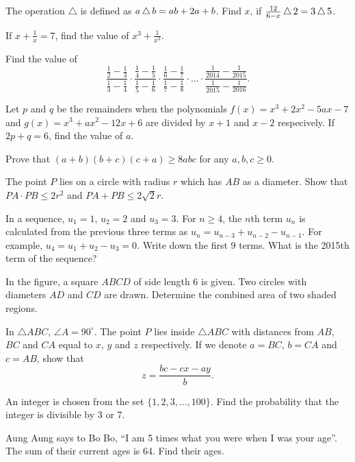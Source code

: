 \begin{problems}
    \problem The operation $\triangle$ is defined as $a \operatorname{\triangle} b = ab + 2a +
    b$. Find $x$, if $\frac{12}{6 - x} \operatorname{\triangle} 2 = 3 \operatorname{\triangle} 5$. 

    \problem If $x + \frac{1}{x} = 7$, find the value of $x^3 + \frac{1}{x^3}$. 

    \problem Find the value of 
    \[
    \frac{\frac{1}{2} - \frac{1}{3}}{\frac{1}{3} - \frac{1}{4}} \cdot
    \frac{\frac{1}{4} - \frac{1}{5}}{\frac{1}{5} - \frac{1}{6}} \cdot
    \frac{\frac{1}{6} - \frac{1}{7}}{\frac{1}{7} - \frac{1}{8}} \cdot \ldots \cdot
    \frac{\frac{1}{2014} - \frac{1}{2015}}{\frac{1}{2015} - \frac{1}{2016}}.
    \]

    \problem Let $p$ and $q$ be the remainders when the polynomials $f(x) = x^3
    + 2x^2 - 5ax - 7$ and $g(x) = x^3 + ax^2 - 12x + 6$ are divided by $x + 1$
    and $x - 2$ respecively. If $2p + q = 6$, find the value of $a$.

    \problem Prove that $(a + b)(b + c)(c + a) \geq 8abc$ for any $a, b, c \geq
    0$. 

    \problem The point $P$ lies on a circle with radius $r$ which has $AB$ as a
    diameter. Show that $PA \cdot  PB \leq 2r^2$ and $PA + PB \leq 2\sqrt{2}r$.

    \problem In a sequence, $u_{1} = 1$, $u_{2} = 2$ and $u_{3} = 3$. For $n
    \geq 4$, the $n$th term $u_{n}$ is calculated from the previous three terms
    as $u_{n} = u_{n - 3} + u_{n - 2} - u_{n - 1}$. For example, $u_{4} = u_{1}
    + u_{2} - u_{3} = 0$. Write down the first 9 terms. What is the 2015th term
    of the sequence?

    \problem In the figure, a square $ABCD$ of side length 6 is given. Two
    circles with diameters $AD$ and $CD$ are drawn. Determine the combined area
    of two shaded regions.

    \problem In $\triangle ABC$, $\angle A = 90^\circ$. The point $P$ lies
    inside $\triangle ABC$ with distances from $AB$, $BC$ and $CA$ equal to $x$,
    $y$ and $z$ respectively. If we denote $a = BC$, $b = CA$ and $c = AB$, show
    that 
    \[ z = \frac{bc - cx - ay}{b}. \]

    \problem An integer is chosen from the set $\{1, 2, 3, \ldots, 100\}$. Find
    the probability that the integer is divisible by 3 or 7.

    \problem Aung Aung says to Bo Bo, ``I am 5 times what you were when I was
    your age''.  The sum of their current ages is 64. Find their ages.


\end{problems}
